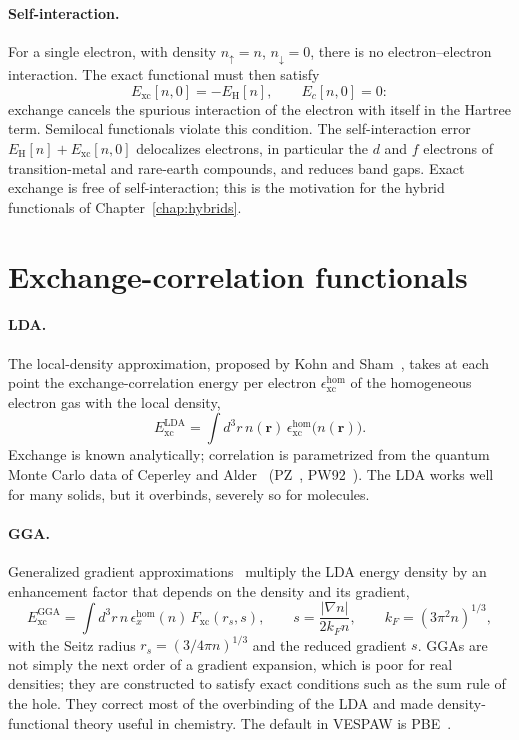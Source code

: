 \documentclass[11pt,a4paper,oneside]{book}
\begin{document}
\paragraph{Self-interaction.} For a single electron, with density
$n_\uparrow=n$, $n_\downarrow=0$, there is no electron--electron
interaction. The exact functional must then satisfy
\begin{equation}
  E_{\mathrm{xc}}[n,0]=-E_{\mathrm H}[n],\qquad E_c[n,0]=0 :
\end{equation}
exchange cancels the spurious interaction of the electron with itself
in the Hartree term. Semilocal functionals violate this condition. The
self-interaction error $E_{\mathrm H}[n]+E_{\mathrm{xc}}[n,0]$ delocalizes
electrons, in particular the $d$ and $f$ electrons of transition-metal
and rare-earth compounds, and reduces band gaps. Exact exchange is free
of self-interaction; this is the motivation for the hybrid functionals
of Chapter~\ref{chap:hybrids}.

\section{Exchange-correlation functionals}

\paragraph{LDA.} The local-density approximation, proposed by Kohn and
Sham~\cite{KohnSham1965}, takes at each point the exchange-correlation
energy per electron $\epsilon_{\mathrm{xc}}^{\mathrm{hom}}$ of the
homogeneous electron gas with the local density,
\begin{equation}
  E_{\mathrm{xc}}^{\mathrm{LDA}}=\int d^3r\,n(\bm r)\,\epsilon_{\mathrm{xc}}^{\mathrm{hom}}\bigl(n(\bm r)\bigr).
\end{equation}
Exchange is known analytically; correlation is parametrized from the
quantum Monte Carlo data of Ceperley and Alder~\cite{ceperley80_prl45_566}
(PZ~\cite{perdew81_prb23_5048}, PW92~\cite{perdew92_prb45_13244}). The LDA
works well for many solids, but it overbinds, severely so for molecules.

\paragraph{GGA.} Generalized gradient
approximations~\cite{langreth83_prb28_1809} multiply the LDA energy density
by an enhancement factor that depends on the density and its gradient,
\begin{equation}
  E_{\mathrm{xc}}^{\mathrm{GGA}}=\int d^3r\,n\,\epsilon_{x}^{\mathrm{hom}}(n)\,F_{\mathrm{xc}}(r_s,s),
  \qquad
  s=\frac{|\nabla n|}{2k_Fn},\qquad k_F=(3\pi^2n)^{1/3},
\end{equation}
with the Seitz radius $r_s=(3/4\pi n)^{1/3}$ and the reduced gradient $s$.
GGAs are not simply the next order of a gradient expansion, which is
poor for real densities; they are constructed to satisfy exact
conditions such as the sum rule of the hole. They correct most of the
overbinding of the LDA and made density-functional theory useful in
chemistry. The default in VESPAW is PBE~\cite{perdew96_prl77_3865}.
\end{document}
